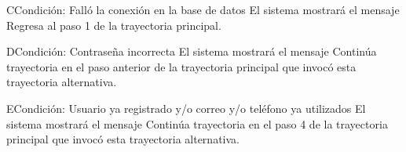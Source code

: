 	\begin{UCtrayectoriaA}{C}{Condición: Falló la conexión en la base de datos}
		\UCpaso[\UCsist] El sistema mostrará el mensaje 
		\UCpaso[\UCsist] Regresa al paso 1 de la trayectoria principal. 
	\end{UCtrayectoriaA}
	\begin{UCtrayectoriaA}{D}{Condición: Contraseña incorrecta}
		\UCpaso[\UCsist] El sistema mostrará el mensaje 
		\UCpaso[\UCsist] Continúa trayectoria en el paso anterior de la trayectoria  principal que invocó esta trayectoria alternativa. 
	\end{UCtrayectoriaA}
	\begin{UCtrayectoriaA}{E}{Condición: Usuario ya registrado y/o correo y/o teléfono ya utilizados}
			\UCpaso[\UCsist] El sistema mostrará el mensaje 
			\UCpaso[\UCsist] Continúa trayectoria en el paso 4 de la trayectoria  principal que invocó esta trayectoria alternativa. 
	\end{UCtrayectoriaA}
